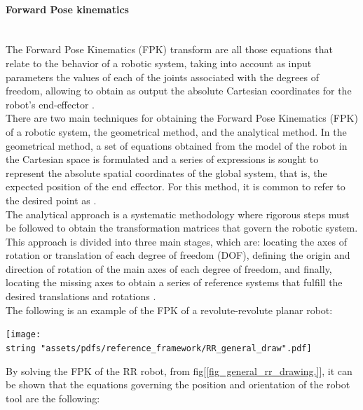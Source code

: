 \documentclass[11pt]{report} %
\newcommand{\subsubsubsection}[1]{\paragraph{#1}\mbox{}\\}
\begin{document}
\subsubsubsection{Forward Pose kinematics}

The Forward Pose Kinematics (FPK) transform are all those equations that relate to the behavior of a robotic system, taking into account as input parameters the values of each of the joints associated with the degrees of freedom, allowing to obtain as output the absolute Cartesian coordinates for the robot's end-effector \citep{cite_craig_robotics}.\\

There are two main techniques for obtaining the Forward Pose Kinematics (FPK) of a robotic system, the geometrical method, and the analytical method. In the geometrical method, a set of equations obtained from the model of the robot in the Cartesian space is formulated and a series of expressions is sought to represent the absolute spatial coordinates of the global system, that is, the expected position of the end effector. For this method, it is common to refer to the desired point as  \citep{cite_craig_robotics}.\\

The analytical approach is a systematic methodology where rigorous steps must be followed to obtain the transformation matrices that govern the robotic system. This approach is divided into three main stages, which are: locating the axes of rotation or translation of each degree of freedom (DOF), defining the origin and direction of rotation of the main axes of each degree of freedom, and finally, locating the missing axes to obtain a series of reference systems that fulfill the desired translations and rotations \citep{cite_barrientos_robotics_book}.\\

The following is an example of the FPK of a revolute-revolute planar robot:

\begin{center}
\texttt{[image: \\string "assets/pdfs/reference\_framework/RR\_general\_draw".pdf]}
\bigbreak
\begin{minipage}{\linewidth} %
\label{fig_general_rr_drawing.}
\end{minipage} \end{center}

By solving the FPK of the RR robot, from fig[\ref{fig_general_rr_drawing.}], it can be shown that the equations governing the position and orientation of the robot tool are the following:
\end{document}
